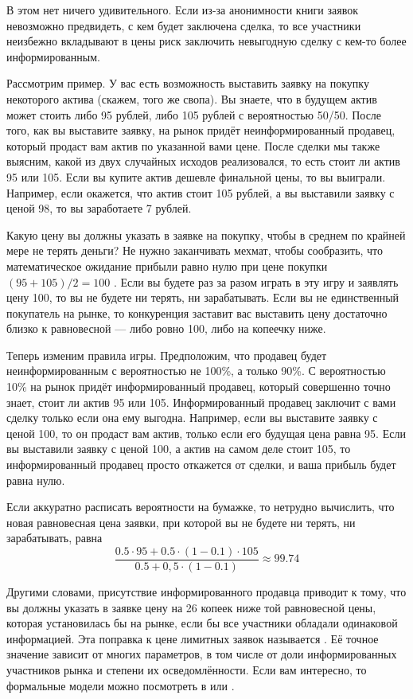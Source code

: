 В этом нет ничего удивительного. Если из-за анонимности книги заявок невозможно
предвидеть, с кем будет заключена сделка, то все участники неизбежно вкладывают
в цены риск заключить невыгодную сделку с кем-то более информированным. 

Рассмотрим пример. У вас есть возможность выставить заявку на покупку некоторого
актива (скажем, того же свопа). Вы знаете, что в будущем актив может стоить
либо 95 рублей, либо 105 рублей с вероятностью 50/50. После того, как вы
выставите заявку, на рынок придёт неинформированный продавец, который продаст
вам актив по указанной вами цене. После сделки мы также выясним, какой из двух
случайных исходов реализовался, то есть стоит ли актив 95 или 105. Если вы купите
актив дешевле финальной цены, то вы выиграли. Например, если окажется, что актив
стоит 105 рублей, а вы выставили заявку с ценой 98, то вы заработаете 7 рублей.

Какую цену вы должны указать в заявке на покупку, чтобы в среднем по крайней
мере не терять деньги? Не нужно заканчивать мехмат, чтобы сообразить, что
математическое ожидание прибыли равно нулю при цене покупки $(95+105)/2 = 100$ .
Если вы будете раз за разом играть в эту игру и заявлять цену 100, то вы не будете ни
терять, ни зарабатывать. Если вы не единственный покупатель на рынке, то конкуренция
заставит вас выставить цену достаточно близко к равновесной --- либо ровно 100, либо
на копеечку ниже.

Теперь изменим правила игры. Предположим, что продавец будет неинформированным
с вероятностью не 100\%, а только 90\%. С вероятностью 10\% на рынок придёт 
информированный продавец, который совершенно точно знает, стоит ли актив 95 или
105. Информированный продавец заключит с вами сделку только если она ему выгодна.
Например, если вы выставите заявку с ценой 100, то он продаст вам актив, только если 
его будущая цена равна 95. Если вы выставили заявку с ценой 100, а актив на самом деле
стоит 105, то информированный продавец просто откажется от сделки, и ваша прибыль
будет равна нулю.

Если аккуратно расписать вероятности на бумажке, то нетрудно вычислить, что новая 
равновесная цена заявки, при которой вы не будете ни терять, ни зарабатывать, равна 
$$\frac{0.5\cdot95 + 0.5\cdot(1-0.1)\cdot105}{0.5 + 0,5\cdot(1-0.1)} \approx 99.74$$

Другими словами, присутствие информированного продавца приводит к тому,
что вы должны указать в заявке цену на 26 копеек ниже той равновесной цены,
которая установилась бы на рынке, если бы все участники обладали одинаковой
информацией. Эта поправка к цене лимитных заявок называется . Её точное значение зависит от многих
параметров, в том числе от доли информированных участников рынка и степени их
осведомлённости. Если вам интересно, то формальные модели можно посмотреть в
\cite[ch. 11]{hasbrouck2017securities} или \cite[ch. 6]{foucault2013market}.

